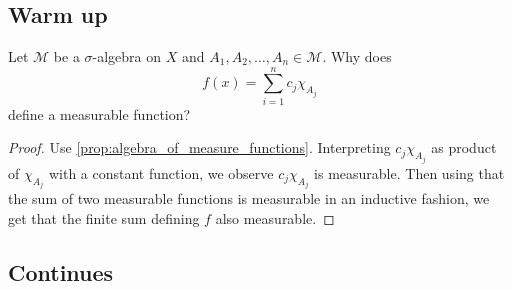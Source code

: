 
\chapter{}

\section{Warm up}
Let $\mathcal{M}$ be a $\sigma$-algebra on $X$ and $A_1, A_2, \ldots , A_n \in \mathcal{M}$. Why does \[
  f(x) = \sum_{i = 1}^{n} c_j \chi_{A_j}
\]
define a measurable function?
\begin{proof}
  Use 
   \autoref{prop:algebra_of_measure_functions}. Interpreting $c_j \chi_{A_j}$ as product of $\chi_{A_j}$ with a constant function, we observe $c_j \chi_{A_j}$ is measurable. Then using that the sum of two measurable functions is measurable in an inductive fashion, we get that the finite sum defining $f$ also measurable.
\end{proof}

\section{Continues}

